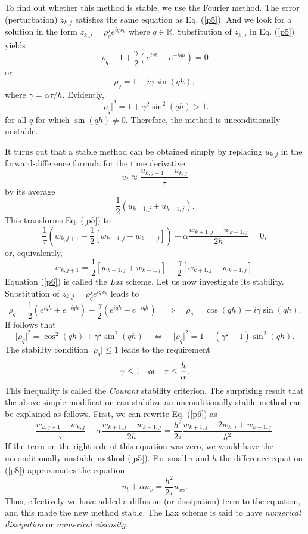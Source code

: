  
 
To find out whether this method is stable, we use the Fourier method. The error
(perturbation) $z_{k,j}$ satisfies the same equation as Eq. (\ref{p5}). And we look
for a solution in the form $z_{k,j}=\rho^{j}_{q}e^{iqx_{k}}$ where $q\in{\mathbb R}$.
Substitution of $z_{k,j}$ in Eq. (\ref{p5}) yields
\[
\rho_{q}-1+\frac{\gamma}{2}\left(e^{iqh}-e^{-iqh}\right)=0
\]
or
\[
\rho_{q}=1-i\gamma\sin(qh),
\]
where $\gamma=\alpha\tau/h$. Evidently,
\[
\vert\rho_{q}\vert^2=1+\gamma^2\sin^2(qh) >1 .
\]
for all $q$ for which $\sin(qh)\neq 0$. Therefore,
the method is unconditionally unstable.



   
It turns out that a stable method can be obtained simply by replacing $u_{k,j}$ in the forward-difference formula for
the time derivative
\[
u_{t}\approx \frac{u_{k,j+1}-u_{k,j}}{\tau}
\]
by its average
\[
\frac{1}{2}\left(u_{k+1,j}+u_{k-1,j}\right).
\]
This transforms Eq. (\ref{p5}) to
\[
\frac{1}{\tau}\left(w_{k,j+1}-\frac{1}{2}[w_{k+1,j}+w_{k-1,j}]\right) + \alpha \frac{w_{k+1,j}-w_{k-1,j}}{2h} =0,
\]
or, equivalently,
\begin{equation}
w_{k,j+1}=\frac{1}{2}[w_{k+1,j}+w_{k-1,j}] - \frac{\gamma}{2}\left[w_{k+1,j}-w_{k-1,j}\right] . \label{p6}
\end{equation}
Equation (\ref{p6}) is called the {\it Lax} scheme.
Let us now investigate its stability. Substitution of $z_{k,j}=\rho^{j}_{q}e^{iqx_{k}}$ leads to
\[
\rho_{q}=\frac{1}{2}\left(e^{iqh}+e^{-iqh}\right)
-\frac{\gamma}{2}\left(e^{iqh}-e^{-iqh}\right) \quad \Rightarrow \quad
\rho_{q}=\cos(qh)-i\gamma\sin(qh).
\]
If follows that
\[
\vert\rho_{q}\vert^2=\cos^2(qh)+\gamma^2\sin^2(qh) \quad \Leftrightarrow \quad
\vert\rho_{q}\vert^2=1+(\gamma^2-1)\sin^2(qh).
\]
The stability condition $\vert \rho_{q}\vert\leq 1$ leads to the requirement
\begin{equation}
\gamma \leq 1 \quad {\rm or} \quad \tau \leq \frac{h}{\alpha}. \label{p7}
\end{equation}
This inequality is called the {\it Courant} stability criterion. The surprising result that the above simple modification
can stabilize an unconditionally stable method can be explained as follows. First, we can rewrite
Eq. (\ref{p6}) as
\begin{equation}
\frac{w_{k,j+1}-w_{k,j}}{\tau}+
 \alpha\frac{w_{k+1,j}-w_{k-1,j}}{2h}= \frac{h^2}{2\tau}\frac{w_{k+1,j}-2w_{k,j}+w_{k-1,j}}{h^2}. \label{p8}
\end{equation}
If the term on the right side of this equation was zero, we would have the unconditionally unstable
method (\ref{p5}). For small $\tau$ and $h$ the difference equation (\ref{p8}) approximates
the equation
\begin{equation}
u_{t}+\alpha u_{x}=\frac{h^2}{2\tau}u_{xx}. \label{p9}
\end{equation}
Thus, effectively we have added a diffusion (or dissipation) term
to the equation, and this made the new method stable. The Lax scheme is said to have
{\it numerical dissipation} or {\it numerical viscosity}.


